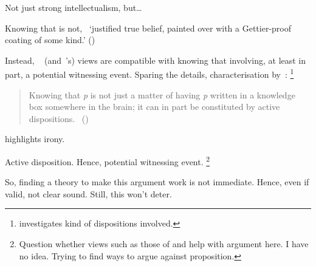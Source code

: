 \begin{note}
  Not just strong intellectualism, but\dots

  Knowing that is not,~\cite{Stalnaker:2012tp} `justiﬁed true belief, painted over with a Gettier-proof coating of some kind.' (\citeyear[754]{Stalnaker:2012tp})

  Instead, ~\citeauthor{Stanley:2011ut} (and~\citeauthor{Stalnaker:2012tp}'s) views are compatible with knowing that involving, at least in part, a potential witnessing event.
  Sparing the details, characterisation by~\citeauthor{Weatherson:2017tb}:%
  \footnote{
    \textcite{Weatherson:2017tb} investigates kind of dispositions involved.
  }

  \nocite{Stanley:2012wg}
  \begin{quote}
    Knowing that \emph{p} is not just a matter of having \emph{p} written in a knowledge box somewhere in the brain; it can in part be constituted by active dispositions.%
    \mbox{ }\hfill\mbox{(\citeyear[8]{Weatherson:2017tb})}
  \end{quote}

  \citeauthor{Stalnaker:2012tp} highlights irony.

  Active disposition.
  Hence, potential witnessing event.%
  \footnote{
    Question whether views such as those of \cite{Stalnaker:2012tp} and \citeauthor{Stanley:2011ut} help with argument here.
    I have no idea.
    Trying to find ways to argue against proposition.
  }
\end{note}

\begin{note}
  So, finding a theory to make this argument work is not immediate.
  Hence, even if valid, not clear sound.
  Still, this won't deter.
\end{note}


